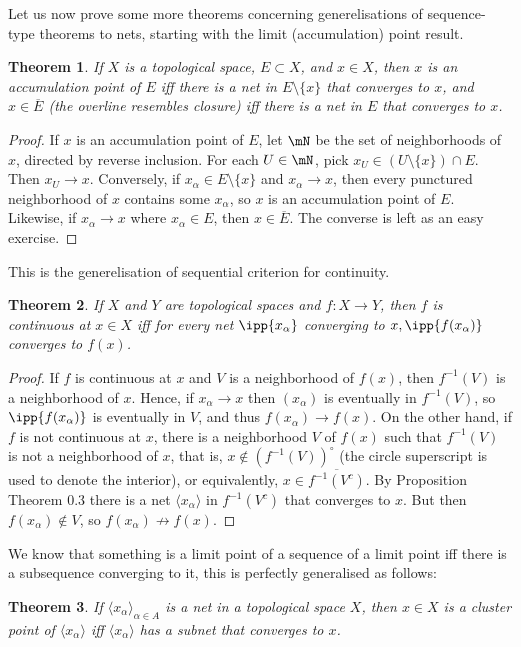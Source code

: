 \documentclass[12pt,english]{article}
\newtheorem{theorem}{Theorem}[section]
\begin{document}
Let us now prove some more theorems concerning generelisations of sequence-type theorems to nets, starting with the limit (accumulation) point result.  
\begin{theorem}
If $X$ is a topological space, $E \subset X$, and $x \in X$, then $x$ is an accumulation point of $E$ iff there is a net in $E \setminus \{x\}$ that converges to $x$, and $x \in \overline{E}$ (the overline resembles closure) iff there is a net in $E$ that converges to $x$. 
\end{theorem}
\begin{proof}
If $x$ is an accumulation point of $E$, let $\mN$ be the set of neighborhoods of $x$, directed by reverse inclusion. 
For each $U \in \mN$, pick $x_U \in (U \setminus \{x\}) \cap E$. Then $x_U \to x$. Conversely, if $x_\alpha \in E \setminus \{x\}$ and $x_\alpha \to x$, then every punctured neighborhood of $x$ contains some $x_\alpha$, so $x$ is an accumulation point of $E$. Likewise, if $x_\alpha \to x$ where $x_\alpha \in E$, then $x \in \overline{E}$. The converse is left as an easy exercise. 
\end{proof}
This is the generelisation of sequential criterion for continuity. 
\begin{theorem}
    If $X$ and $Y$ are topological spaces and $f : X \to Y$, then $f$ is continuous at $x \in X$ iff for every net $\ipp{x_\alpha}$ converging to $x, \ipp{f(x_\alpha)}$ converges to $f(x)$. 
\end{theorem}
\begin{proof}
    If $f$ is continuous at $x$ and $V$ is a neighborhood of $f(x)$, then $f^{-1}(V)$ is a neighborhood of $x$. Hence, if $x_\alpha \to x$ then $(x_\alpha)$ is eventually in $f^{-1}(V)$, so $\ipp{f(x_\alpha)}$ is eventually in $V$, and thus $f(x_\alpha) \to f(x)$. On the other hand, if $f$ is not continuous at $x$, there is a neighborhood $V$ of $f(x)$ such that $f^{-1}(V)$ is not a neighborhood of $x$, that is, $x \notin (f^{-1}(V))^\circ$ (the circle superscript is used to denote the interior), or equivalently, $x \in \overline{f^{-1}(V^c)}$. 
By Proposition Theorem 0.3 there is a net $\langle x_\alpha \rangle$ in $f^{-1}(V^c)$ that converges to $x$. But then $f(x_\alpha) \notin V$, so $f(x_\alpha) \not\to f(x)$. 
\end{proof}
We know that something is a limit point of a sequence of a limit point iff there is a subsequence converging to it, this is perfectly generalised as follows: 
\begin{theorem}
If $\langle x_\alpha \rangle_{\alpha \in A}$ is a net in a topological space $X$, then $x \in X$ is a cluster point of $\langle x_\alpha \rangle$ iff $\langle x_\alpha \rangle$ has a subnet that converges to $x$. 
\end{theorem}
\end{document}
